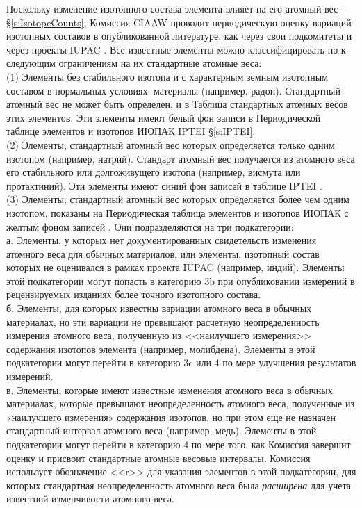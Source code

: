\documentclass[a5paper,openany]{book}
\begin{document}
Поскольку изменение изотопного состава элемента влияет на его атомный вес -- \S\ref{s:IsotopeCounts}, Комиссия CIAAW
проводит периодическую оценку вариаций изотопных составов в опубликованной литературе, как
через свои подкомитеты и через проекты IUPAC \cite{IUPACMS2020}. Все известные элементы можно классифицировать по к следующим ограничениям на их стандартные атомные веса: \\
(1) Элементы без стабильного изотопа и с характерным земным изотопным составом в нормальных условиях.
материалы (например, радон). Стандартный атомный вес не может быть определен, и в
Таблица стандартных атомных весов этих элементов. Эти элементы имеют белый фон
записи в Периодической таблице элементов и изотопов ИЮПАК IPTEI \cite{IPTEI} \S\ref{s:IPTEI}.  \\
(2) Элементы, стандартный атомный вес которых определяется только одним изотопом (например, натрий). Стандарт атомный вес получается из атомного веса его стабильного или долгоживущего изотопа (например, висмута или протактиний). Эти элементы имеют синий фон записей в таблице IPTEI \cite{IPTEI}.  \\
(3) Элементы, стандартный атомный вес которых определяется более чем одним изотопом, показаны на
Периодическая таблица элементов и изотопов ИЮПАК с желтым фоном записей \cite{IPTEI}. Они 
подразделяются на три подкатегории:  \\
а. Элементы, у которых нет документированных свидетельств изменения атомного веса для обычных материалов, или элементы, изотопный состав которых не оценивался в рамках проекта IUPAC (например,
индий). Элементы этой подкатегории могут попасть в категорию 3b при опубликовании  измерений в рецензируемых изданиях более точного изотопного состава. \\
б. Элементы, для которых известны вариации атомного веса в обычных материалах, но эти вариации
не превышают расчетную неопределенность измерения атомного веса, полученную из <<наилучшего
измерения>> содержания изотопов элемента (например, молибдена). Элементы в этой подкатегории
могут перейти в категорию 3c или 4 по мере улучшения результатов измерений. \\
в. Элементы, которые имеют известные изменения атомного веса в обычных материалах, которые превышают
неопределенность атомного веса, полученные из «наилучшего измерения» содержания изотопов, но
при этом еще не назначен стандартный интервал атомного веса (например, медь). Элементы в этой
подкатегории могут перейти в категорию 4 по мере того, как Комиссия завершит оценку и присвоит стандартные атомные весовые интервалы. Комиссия использует обозначение <<r>> для указания элементов в этой
подкатегории, для которых стандартная неопределенность атомного веса была \emph{расширена} для учета
известной изменчивости атомного веса.
\end{document}
